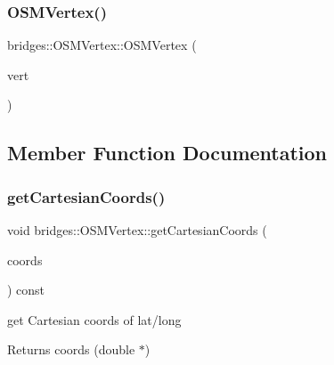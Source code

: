 \subsubsection{\texorpdfstring{O\+S\+M\+Vertex()}{OSMVertex()}\hspace{0.1cm}{\footnotesize\ttfamily [3/3]}}
{\footnotesize\ttfamily bridges\+::\+O\+S\+M\+Vertex\+::\+O\+S\+M\+Vertex (\begin{DoxyParamCaption}\item[{const \mbox{\hyperlink{classbridges_1_1_o_s_m_vertex}{O\+S\+M\+Vertex}} $\ast$}]{vert }\end{DoxyParamCaption})\hspace{0.3cm}{\ttfamily [inline]}}



\subsection{Member Function Documentation}
\mbox{\label{classbridges_1_1_o_s_m_vertex_a3c89840e0c5414d38ca177183a6052fa}} 
\subsubsection{\texorpdfstring{get\+Cartesian\+Coords()}{getCartesianCoords()}}
{\footnotesize\ttfamily void bridges\+::\+O\+S\+M\+Vertex\+::get\+Cartesian\+Coords (\begin{DoxyParamCaption}\item[{double $\ast$}]{coords }\end{DoxyParamCaption}) const\hspace{0.3cm}{\ttfamily [inline]}}

get Cartesian coords of lat/long

\begin{DoxyReturn}{Returns}
coords (double $\ast$) 
\end{DoxyReturn}
\mbox{\label{classbridges_1_1_o_s_m_vertex_aeb44f4c3967d9ed15c606699c830ac2c}} 
